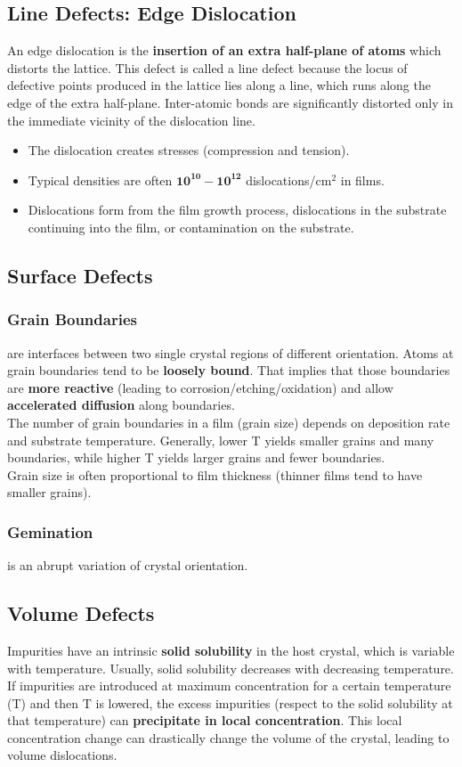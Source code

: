 \documentclass{report}
\begin{document}
\subsection{Line Defects: Edge Dislocation}
An edge dislocation is the \textbf{insertion of an extra half-plane of atoms} which distorts the lattice. This defect is called a line defect because the locus of defective points produced in the lattice lies along a line, which runs along the edge of the extra half-plane. Inter-atomic bonds are significantly distorted only in the immediate vicinity of the dislocation line.
\begin{itemize}
    \item The dislocation creates stresses (compression and tension).
    \item Typical densities are often $\mathbf{10^{10}-10^{12}}$ dislocations/cm$^2$ in films.
    \item Dislocations form from the film growth process, dislocations in the substrate continuing into the film, or contamination on the substrate.
\end{itemize}

\subsection{Surface Defects}
\subsubsection{Grain Boundaries}
 are interfaces between two single crystal regions of different orientation.  Atoms at grain boundaries tend to be \textbf{loosely bound}. That implies that those boundaries are \textbf{more reactive} (leading to corrosion/etching/oxidation) and allow \textbf{accelerated diffusion} along boundaries. \\The number of grain boundaries in a film (grain size) depends on deposition rate and substrate temperature. Generally, lower T yields smaller grains and many boundaries, while higher T yields larger grains and fewer boundaries.\\ Grain size is often proportional to film thickness (thinner films tend to have smaller grains).
\subsubsection{Gemination} is an abrupt variation of crystal orientation.

\subsection{Volume Defects}
Impurities have an intrinsic \textbf{solid solubility} in the host crystal, which is variable with temperature.  Usually, solid solubility decreases with decreasing temperature.\\ If impurities are introduced at maximum concentration for a certain temperature (T) and then T is lowered, the excess impurities (respect to the solid solubility at that temperature) can \textbf{precipitate in local concentration}. This local concentration change can drastically change the volume of the crystal, leading to volume dislocations.
\end{document}
